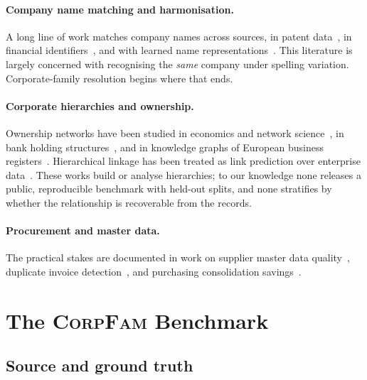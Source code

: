 \paragraph{Company name matching and harmonisation.} A long line of work matches
company names across sources, in patent
data~\citep{magerman2006patentee,thoma2010harmonizing,peeters2010harmonizing}, in financial
identifiers~\citep{chan2013lei,chan2019lei,arimond2023elf}, and with learned name
representations~\citep{ziv2022companyname2vec}. This literature is largely concerned
with recognising the \emph{same} company under spelling variation.
Corporate-family resolution begins where that ends.

\paragraph{Corporate hierarchies and ownership.} Ownership networks have been studied in
economics and network
science~\citep{vitali2011network,mizuno2020corporatecontrol,garciabernardo2017offshore}, in bank
holding structures~\citep{flood2020bhc}, and in knowledge graphs of European business
registers~\citep{roman2022eubusinessgraph,soylu2022theybuyforyou}. Hierarchical linkage
has been treated as link prediction over enterprise
data~\citep{ebeid2021hierarchical,ganesan2020linkprediction,ganesan2024xlp}. These works build
or analyse hierarchies; to our knowledge none releases a public, reproducible benchmark
with held-out splits, and none stratifies by whether the relationship is recoverable
from the records.

\paragraph{Procurement and master data.} The practical stakes are documented in work on
supplier master data
quality~\citep{athanasiadou2019suppliermdm,ibrahim2021masterdataquality,gantman2021vendormaster},
duplicate invoice detection~\citep{ho2009duplicateinvoices,liao2026procurementduplicate},
and purchasing consolidation
savings~\citep{smart2007purchasingsynergy,carril2020consolidation}.

\section{The \textsc{CorpFam} Benchmark}
\label{sec:benchmark}

\subsection{Source and ground truth}

